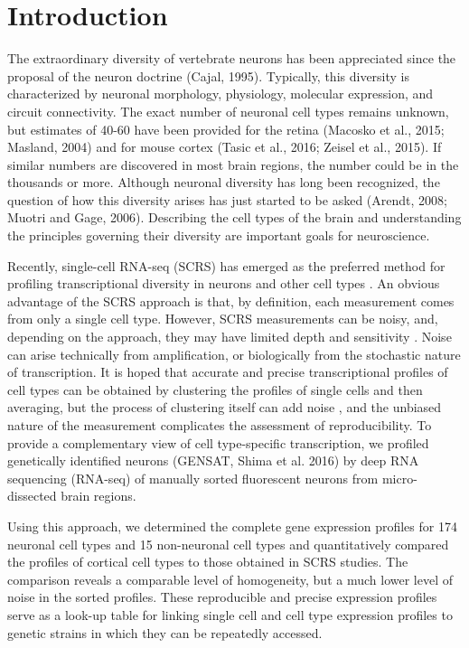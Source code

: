 \section*{Introduction}


The extraordinary diversity of vertebrate neurons has been appreciated since the proposal of the neuron doctrine (Cajal, 1995). Typically, this diversity is characterized by neuronal morphology, physiology, molecular expression, and circuit connectivity. The exact number of neuronal cell types remains unknown, but estimates of 40-60 have been provided for the retina (Macosko et al., 2015; Masland, 2004) and for mouse cortex (Tasic et al., 2016; Zeisel et al., 2015). If similar numbers are discovered in most brain regions, the number could be in the thousands or more. Although neuronal diversity has long been recognized, the question of how this diversity arises has just started to be asked (Arendt, 2008; Muotri and Gage, 2006). Describing the cell types of the brain and understanding the principles governing their diversity are important goals for neuroscience.

Recently, single-cell RNA-seq (SCRS) has emerged as the preferred method for profiling transcriptional diversity in neurons and other cell types \cite{Shapiro_2013}. An obvious advantage of the SCRS approach is that, by definition, each measurement comes from only a single cell type. However, SCRS measurements can be noisy, and, depending on the approach, they may have limited depth and sensitivity \cite{Parekh_2016}\cite{Svensson_2017}. Noise can arise technically from amplification, or biologically from the stochastic nature of transcription. It is hoped that accurate and precise transcriptional profiles of cell types can be obtained by clustering the profiles of single cells and then averaging, but the process of clustering itself can add noise \cite{Ntranos_2016}, and the unbiased nature of the measurement complicates the assessment of reproducibility. To provide a complementary view of cell type-specific transcription, we profiled genetically identified neurons (GENSAT, Shima et al. 2016) by deep RNA sequencing (RNA-seq) of manually sorted fluorescent neurons from micro-dissected brain regions.  

Using this approach, we determined the complete gene expression profiles for 174 neuronal cell types and 15 non-neuronal cell types and quantitatively compared the profiles of cortical cell types to those obtained in SCRS studies. The comparison reveals a comparable level of homogeneity, but a much lower level of noise in the sorted profiles. These reproducible and precise expression profiles serve as a look-up table for linking single cell and cell type expression profiles to genetic strains in which they can be repeatedly accessed. 

